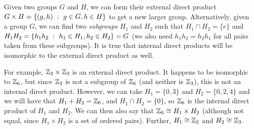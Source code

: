 \protect \documentclass [11pt]{exam}
\renewenvironment{Ans}[1]{\setcounter{question}{#1}\addtocounter{question}{-1}\question }{}
\begin{document}
\begin{questions}
\begin{Ans}{5}
\end{Ans}
\begin{Ans}{6}
  Given two groups $G$ and $H$, we can form their external direct product $G\times H = \{(g,h) ~:~ g \in G, h \in H\}$ to get a new larger group.  Alternatively, given a group $G$, we can find two \emph{subgroups} $H_1$ and $H_2$ such that $H_1 \cap H_2 = \{e\}$ and $H_1H_2 = \{h_1h_2 ~:~ h_1 \in H_1, h_2 \in H_2\} = G$ (we also need $h_1h_2 = h_2h_1$ for all pairs taken from these subgroups).  It is true that internal direct products will be isomorphic to the external direct product as well.

  For example, $\mathbb Z_2 \times \mathbb Z_3$ is an external direct product.  It happens to be isomorphic to $\mathbb Z_6$, but since $\mathbb Z_2$ is not a subgroup of $\mathbb Z_6$ (and neither is $\mathbb Z_3$), this is not an internal direct product.  However, we can take $H_1 = \{0,3\}$ and $H_2 = \{0,2,4\}$ and we will have that $H_1+H_2 = \mathbb Z_6$, and $H_1 \cap H_2 = \{0\}$, so $\mathbb Z_6$ is the internal direct product of $H_1$ and $H_2$.  We can then also say that $\mathbb Z_6 \cong H_1 \times H_2$ (although not equal, since $H_1 \times H_2$ is a set of ordered pairs).  Further, $H_1 \cong \mathbb Z_2$ and $H_2 \cong \mathbb Z_3$.
\end{Ans}
\begin{Ans}{7}
\end{Ans}
\end{questions}
\end{document}

